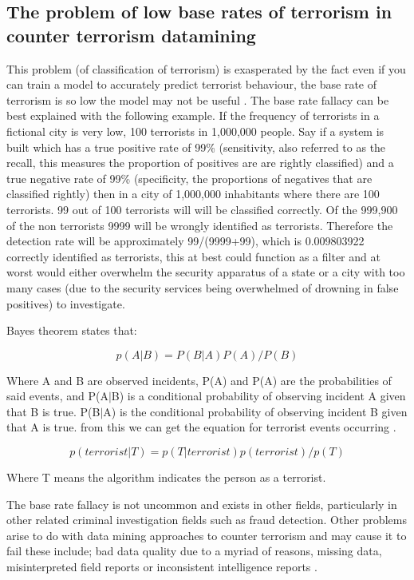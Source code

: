 \subsection{The problem of low base rates of terrorism in counter terrorism datamining}

This problem (of classification of terrorism) is exasperated by the fact even if you can train a model to accurately predict terrorist behaviour, the base rate of terrorism is so low the model may not be useful \citep{jensen2003information}. The base rate fallacy can be best explained with the following example. If the frequency of terrorists in a fictional city is very low, 100 terrorists in 1,000,000 people. Say if a system is built which has a true positive rate of 99\% (sensitivity, also referred to as the recall, this measures the proportion of positives are are rightly classified) and a true negative rate of 99\% (specificity, the proportions of negatives that are classified rightly) then in a city of 1,000,000 inhabitants where there are 100 terrorists. 99 out of 100 terrorists will will be classified correctly. Of the 999,900 of the non terrorists 9999 will be wrongly identified as terrorists. Therefore the detection rate will be approximately 99/(9999+99), which is  0.009803922 correctly identified as terrorists, this at best could function as a filter and at worst would either overwhelm the security apparatus of a state or a city with too many cases (due to the security services being overwhelmed of drowning in false positives) to investigate. 

Bayes theorem states that:

\begin{equation} p(A|B)=P(B|A)P(A)/P(B) \label{eq1bayes}  \end{equation}

Where A and B are observed incidents, P(A) and P(A) are the probabilities of said events, and P(A$\vert$B) is a conditional probability of observing incident A given that B is true. P(B$\vert$A) is the conditional probability of observing incident B given that A is true. from this we can get the equation for terrorist events occurring  \label{eq2bayes}.
 
\begin{equation} p(terrorist|T)=p(T|terrorist)p(terrorist)/p(T) \label{eq2bayes}  \end{equation}

Where T means the algorithm indicates the person as a terrorist.

The base rate fallacy is not uncommon and exists in other fields, particularly in other related criminal investigation fields such as fraud detection. Other problems arise to do with data mining approaches to counter terrorism and may cause it to fail these include; bad data quality due to a myriad of reasons, missing data, misinterpreted field reports or inconsistent intelligence reports \citep{thuraisingham2004data}. 

